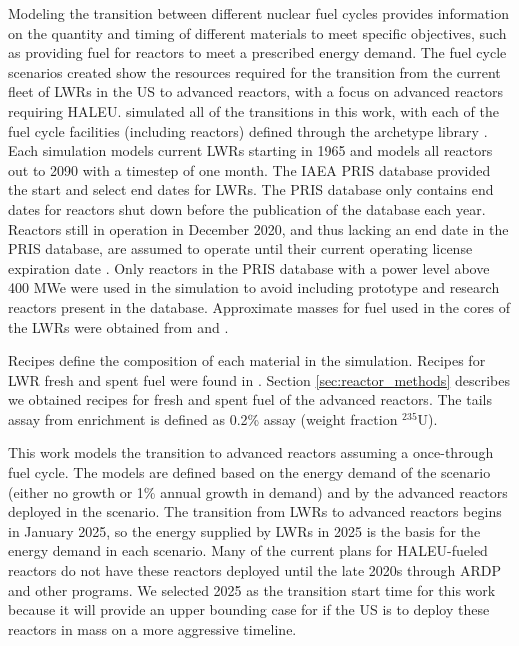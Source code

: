 Modeling the transition between different nuclear fuel cycles provides 
information on the quantity and timing of different materials to meet 
specific objectives, such as providing fuel for reactors to meet a 
prescribed energy demand. 
The fuel cycle scenarios created show the resources required for the transition from the 
current fleet of \glspl{LWR} in the US to advanced reactors, with a focus on 
advanced reactors requiring \gls{HALEU}.
\Cyclus \cite{huff_fundamental_2016} simulated all of the transitions in this 
work, with each of the fuel cycle facilities (including reactors) defined through 
the \Cycamore archetype library \cite{carlsen_cycamore_2014}. Each simulation models 
current 
\glspl{LWR} starting in 1965 and models all reactors out to 2090 with a timestep 
of one month. The \gls{IAEA} \gls{PRIS} database \cite{noauthor_power_1989} 
provided the start and select end dates for \glspl{LWR}. The \gls{PRIS} database 
only contains end dates for reactors shut down before the publication of the 
database each year. Reactors still in 
operation in December 2020, and thus 
lacking an end date in the \gls{PRIS} database, are assumed to operate until their 
current operating license expiration date
\cite{noauthor_us_nodate}.
Only reactors in the \gls{PRIS} database with a power level above 400 MWe 
were used in the simulation 
to avoid including prototype and research reactors present in the database. 
Approximate masses for fuel used in the cores of the \glspl{LWR} were obtained 
from \cite{todreas_nuclear_2012} and \cite{cacuci_handbook_2010}. 

Recipes define the composition of each material in the simulation. 
Recipes for \gls{LWR} fresh and spent fuel were found in \cite{jacobson_verifiable_2010}.
Section \ref{sec:reactor_methods} describes we obtained recipes for fresh 
and spent fuel of the advanced reactors. The tails assay from enrichment 
is defined as 0.2\% assay (weight fraction $^{235}$U). 

This work models the transition to advanced reactors assuming a 
once-through fuel cycle. The models are defined based 
on the energy demand 
of the scenario (either no growth or 1\% annual growth in demand) and by the 
advanced reactors deployed in the scenario. The transition from \glspl{LWR} to 
advanced reactors begins in January 2025, so the energy supplied by 
\glspl{LWR} in 2025 is the basis for the energy demand in each scenario.  
Many of the 
current plans for \gls{HALEU}-fueled reactors do not have these reactors deployed 
until the late 2020s \cite{nichol_current_2021} through \gls{ARDP} and 
other programs. We selected 2025 as the transition 
start time for this 
work because it will provide an upper bounding case for if the US is to deploy 
these reactors in mass on a more aggressive timeline. 


